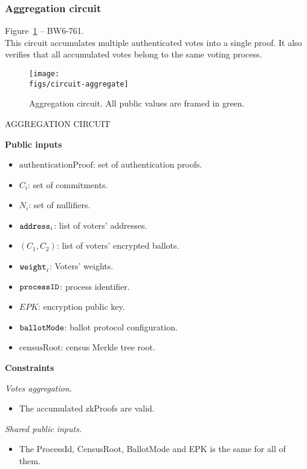 \newpage
\subsubsection{Aggregation circuit}

Figure~\ref{fig:circuit-aggregate} -- BW6-761.\\

\noi This circuit accumulates multiple authenticated votes into a single proof. It also verifies that all accumulated votes belong to the same voting process.

\begin{figure}[h]
	\centerline{\texttt{[image: \\figs/circuit-aggregate]}}
	\caption{Aggregation circuit. All public values are framed in green.}
	\label{fig:circuit-aggregate}
\end{figure}

\begin{mdframed}
	\begin{minipage}[H]{1\textwidth}
		\begin{spacing}{1.25}
			\vspace{0.3cm}
			\begin{center}{AGGREGATION CIRCUIT}\end{center}
			\textbf{Public inputs}
			\begin{itemize}
				\item \public $\text{authenticationProof}$: set of authentication proofs.
				\item \public $C_i$: set of commitments.
				\item \public $N_i$: set of nullifiers.		
				\item \public $\texttt{address}_i$: list of voters' addresses.
				\item \public $(C_1, C_2)$: list of voters' encrypted ballots.
				\item \public $\texttt{weight}_i$: Voters' weights.
				\item \public $\texttt{processID}$: process identifier.
				\item \public $EPK$: encryption public key.
				\item \public $\texttt{ballotMode}$: ballot protocol configuration.
				\item \public $\text{censusRoot}$: census Merkle tree root.
			\end{itemize}
			\textbf{Constraints} \\ \vspace{-0.4cm}		
			
			\emph{Votes aggregation.} 
			\begin{itemize}
				\item The accumulated zkProofs are valid.
			\end{itemize}
			\emph{Shared public inputs.}
			\begin{itemize}
				\item The ProcessId, CensusRoot, BallotMode and EPK is the same for all of them.
			\end{itemize}
			\vspace{-0.3cm}
		\end{spacing}
	\end{minipage}
\end{mdframed}

